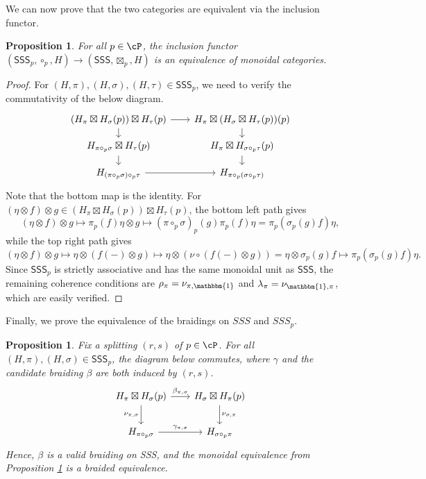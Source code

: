 \documentclass[11pt,reqno]{amsart}
\newcommand{\SSS}{\mathsf{SSS}}
\numberwithin{equation}{section}
\theoremstyle{plain}
\newtheorem{proposition}[equation]{Proposition}
\theoremstyle{definition}
\begin{document}
We can now prove that the two categories are equivalent via the inclusion functor.

\begin{proposition}\label{prop:monoidal-equivalence-to-localized-endomorphisms}
    For all $p\in{\cP}$, the inclusion functor $(\SSS_p,\circ_p,H)\to (\SSS,\boxtimes_p,H)$ is an equivalence of monoidal categories.
\end{proposition}

\begin{proof}
    For $(H,\pi),(H,\sigma),(H,\tau)\in\SSS_p$, we need to verify the commutativity of the below diagram.
    \[
    \begin{tikzcd}[column sep=1em, row sep=1em]
	{(H_\pi\boxtimes H_\sigma(p))\boxtimes H_\tau(p)} && {H_\pi\boxtimes (H_\sigma\boxtimes H_\tau(p))(p)} \\
	{H_{\pi\circ_p\sigma}\boxtimes H_\tau(p)} && {H_\pi\boxtimes H_{\sigma\circ_p\tau}(p)} \\
	{H_{(\pi\circ_p\sigma)\circ_p\tau}} && {H_{\pi\circ_p(\sigma\circ_p\tau)}}
	\arrow[from=1-1, to=1-3]
	\arrow[from=1-1, to=2-1]
	\arrow[from=1-3, to=2-3]
	\arrow[from=2-1, to=3-1]
	\arrow[from=2-3, to=3-3]
	\arrow[from=3-1, to=3-3]
\end{tikzcd}
    \]
    Note that the bottom map is the identity. For $(\eta\otimes f)\otimes g\in (H_\pi\boxtimes H_\sigma(p))\boxtimes H_\tau(p)$, the bottom left path gives
    \[
    (\eta\otimes f)\otimes g\mapsto \pi_p(f)\eta\otimes g\mapsto (\pi\circ_p\sigma)_p(g)\pi_p(f)\eta=\pi_p(\sigma_p(g)f)\eta,
    \]
    while the top right path gives
    \[
    (\eta\otimes f)\otimes g\mapsto\eta\otimes(f(-)\otimes g)\mapsto\eta\otimes(\nu\circ(f(-)\otimes g))=\eta\otimes\sigma_p(g)f\mapsto\pi_p(\sigma_p(g)f)\eta.
    \]
    Since $\SSS_p$ is strictly associative and has the same monoidal unit as $\SSS$, the remaining coherence conditions are $\rho_\pi=\nu_{\pi,\mathbbm{1}}$ and $\lambda_\pi=\nu_{\mathbbm{1},\pi}$, which are easily verified.
\end{proof}

Finally, we prove the equivalence of the braidings on $SSS$ and $SSS_p$. 

\begin{proposition}\label{prop:braided-equivalence-with-localized-enodmorphisms}
    Fix a splitting $(r,s)$ of $p\in\cP$. For all $(H,\pi),(H,\sigma)\in\SSS_p$, the diagram below commutes, where $\gamma$ and the candidate braiding $\beta$ are both induced by $(r,s)$.
    \[\begin{tikzcd}[column sep=1em, row sep=1em]
	{H_\pi\boxtimes H_\sigma(p)} && {H_\sigma\boxtimes H_\pi(p)} \\
	\\
	{H_{\pi\circ_p\sigma}} && {H_{\sigma\circ_p\pi}}
	\arrow["{\beta_{\pi,\sigma}}", from=1-1, to=1-3]
	\arrow["{\nu_{\pi,\sigma}}"', from=1-1, to=3-1]
	\arrow["{\nu_{\sigma,\pi}}", from=1-3, to=3-3]
	\arrow["{\gamma_{\pi,\sigma}}", from=3-1, to=3-3]
\end{tikzcd}\]
Hence, $\beta$ is a valid braiding on SSS, and the monoidal equivalence from Proposition \ref{prop:monoidal-equivalence-to-localized-endomorphisms} is a braided equivalence.
\end{proposition}
\end{document}
